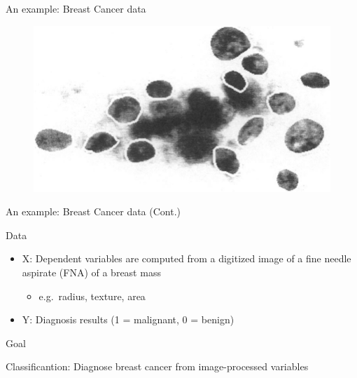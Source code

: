\documentclass[ignorenonframetext,]{beamer}
\providecommand{\tightlist}{%
  \setlength{\itemsep}{0pt}\setlength{\parskip}{0pt}}
\begin{document}
\begin{frame}{An example: Breast Cancer data}

\begin{figure}
\centering
\includegraphics{./pic/breast_cancer.png}
\caption{}
\end{figure}

\end{frame}

\begin{frame}{An example: Breast Cancer data (Cont.)}

\begin{block}{Data}

\begin{itemize}
\tightlist
\item
  X: Dependent variables are computed from a digitized image of a fine
  needle aspirate (FNA) of a breast mass

  \begin{itemize}
  \tightlist
  \item
    e.g.~radius, texture, area
  \end{itemize}
\item
  Y: Diagnosis results (1 = malignant, 0 = benign)
\end{itemize}

\end{block}

\begin{block}{Goal}

Classificantion: Diagnose breast cancer from image-processed variables

\end{block}

\end{frame}
\end{document}
